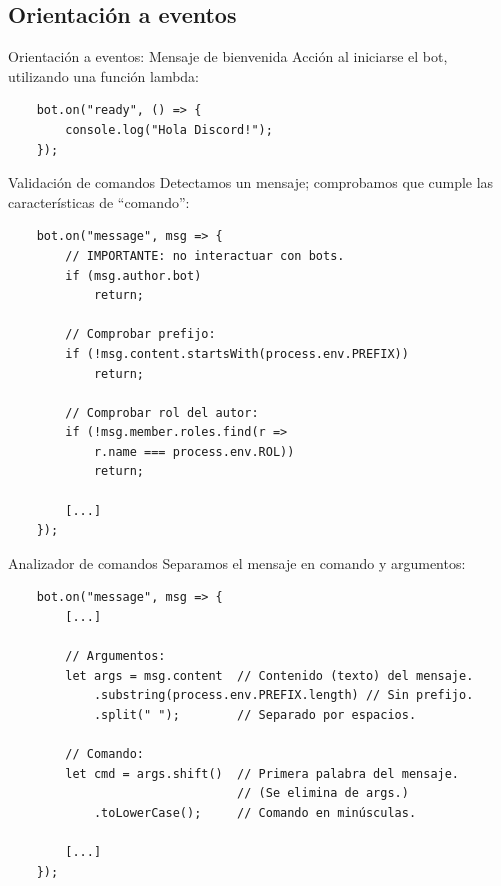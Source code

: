 \documentclass[10pt]{beamer} %
\begin{document}
\subsection{Orientación a eventos}
\begin{frame}[fragile]{Orientación a eventos: Mensaje de bienvenida}
    Acción al iniciarse el bot, utilizando una función lambda:
    \begin{verbatim}
    bot.on("ready", () => {
        console.log("Hola Discord!");
    });
    \end{verbatim}
\end{frame}
\begin{frame}[fragile]{Validación de comandos}
    Detectamos un mensaje; comprobamos que cumple las características de ``comando'':
    \begin{verbatim}
    bot.on("message", msg => {
        // IMPORTANTE: no interactuar con bots.
        if (msg.author.bot)
            return;
        
        // Comprobar prefijo:
        if (!msg.content.startsWith(process.env.PREFIX))
            return;
        
        // Comprobar rol del autor:
        if (!msg.member.roles.find(r =>
            r.name === process.env.ROL))
            return;
            
        [...]
    });
    \end{verbatim}
\end{frame}
\begin{frame}[fragile]{Analizador de comandos}
    Separamos el mensaje en comando y argumentos:
    \begin{verbatim}
    bot.on("message", msg => {
        [...]
        
        // Argumentos:
        let args = msg.content  // Contenido (texto) del mensaje.
            .substring(process.env.PREFIX.length) // Sin prefijo.
            .split(" ");        // Separado por espacios.
        
        // Comando:
        let cmd = args.shift()  // Primera palabra del mensaje.
                                // (Se elimina de args.)
            .toLowerCase();     // Comando en minúsculas.
            
        [...]
    });
    \end{verbatim}
\end{frame}
\end{document}
